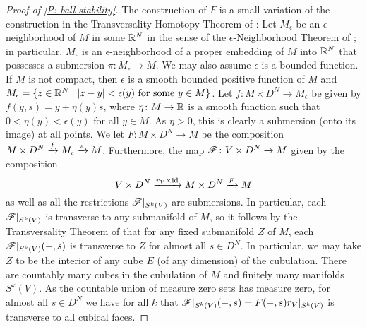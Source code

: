\begin{proof}[Proof of \cref{P: ball stability}]
	The construction of $F$ is a small variation of the construction in the Transversality Homotopy Theorem of \cite[Section 2.3]{GuPo74}:
	Let $M_\epsilon$ be an $\epsilon$-neighborhood of $M$ in some $\mathbb{R}^N$ in the sense of the $\epsilon$-Neighborhood Theorem of \cite[Section 2.3]{GuPo74}; in particular,
	$M_\epsilon$ is an $\epsilon$-neighborhood of a proper embedding of $M$ into $\mathbb{R}^N$ that possesses a submersion $\pi \colon M_\epsilon \to M$.
	We may also assume $\epsilon$ is a bounded function.
	If $M$ is not compact, then $\epsilon$ is a smooth bounded positive function of $M$ and $M_\epsilon = \{z \in \mathbb{R}^N \mid |z-y|<\epsilon(y) \text{ for some }y \in M\}$.
	Let $f \colon M \times D^N \to M_\epsilon$ be given by $f(y, s) = y + \eta(y) s$, where $\eta \colon M \to \mathbb{R}$ is a smooth function such that $0 < \eta(y) < \epsilon(y)$ for all $y \in M$.
	As $\eta > 0$, this is clearly a submersion (onto its image) at all points.
	We let $F \colon M \times D^N \to M$ be the composition $M \times D^N \xrightarrow{f}M_\epsilon \xrightarrow{\pi}M$.
	Furthermore, the map $\mathscr{F} \colon V \times D^N \to M$ given by the composition $$V \times D^N \xrightarrow{r_V \times \mathrm{id}} M \times D^N \xrightarrow{F} M$$ as well as all the restrictions $\mathscr{F}|_{S^k(V)}$
	are submersions.
	In particular, each $\mathscr{F}|_{S^k(V)}$ is transverse to any submanifold of $M$, so it follows by the Transversality Theorem of \cite[Section 2.3]{GuPo74} that for any fixed submanifold $Z$ of $M$, each $\mathscr{F}|_{S^k(V)}(-,s)$ is transverse to $Z$ for almost all $s \in D^N$.
	In particular, we may take $Z$ to be the interior of any cube $E$ (of any dimension) of the cubulation.
	There are countably many cubes in the cubulation of $M$ and finitely many manifolds $S^k(V)$.
	As the countable union of measure zero sets has measure zero, for almost all $s \in D^N$ we have for all $k$ that $\mathscr{F}|_{S^k(V)}(-,s) = F(-,s)r_V|_{S^k(V)}$ is transverse to all cubical faces.


\end{proof}
